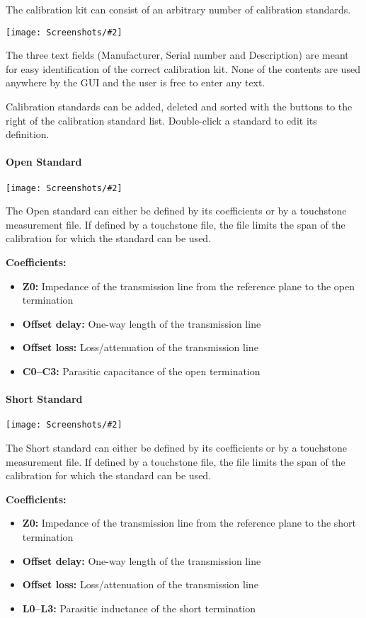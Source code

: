 \documentclass[a4paper,11pt]{article}
\newcommand{\screenshot}[2]{\begin{center}
\texttt{[image: Screenshots/\#2]}
\end{center}}
\begin{document}
The calibration kit can consist of an arbitrary number of calibration standards.
\screenshot{0.5}{CalibrationKitDialog.png}

The three text fields (Manufacturer, Serial number and Description) are meant for easy identification of the correct calibration kit. None of the contents are used anywhere by the GUI and the user is free to enter any text.

Calibration standards can be added, deleted and sorted with the buttons to the right of the calibration standard list. Double-click a standard to edit its definition.

\paragraph{Open Standard}
\screenshot{0.5}{OpenStandardDialog.png}
The Open standard can either be defined by its coefficients or by a touchstone measurement file. If defined by a touchstone file, the file limits the span of the calibration for which the standard can be used.

\textbf{Coefficients:}
\begin{itemize}
\item \textbf{Z0:} Impedance of the transmission line from the reference plane to the open termination
\item \textbf{Offset delay:} One-way length of the transmission line
\item \textbf{Offset loss:} Loss/attenuation of the transmission line
\item \textbf{C0--C3:} Parasitic capacitance of the open termination
\end{itemize}

\paragraph{Short Standard}
\screenshot{0.5}{ShortStandardDialog.png}
The Short standard can either be defined by its coefficients or by a touchstone measurement file. If defined by a touchstone file, the file limits the span of the calibration for which the standard can be used.

\textbf{Coefficients:}
\begin{itemize}
\item \textbf{Z0:} Impedance of the transmission line from the reference plane to the short termination
\item \textbf{Offset delay:} One-way length of the transmission line
\item \textbf{Offset loss:} Loss/attenuation of the transmission line
\item \textbf{L0--L3:} Parasitic inductance of the short termination
\end{itemize}
\end{document}
